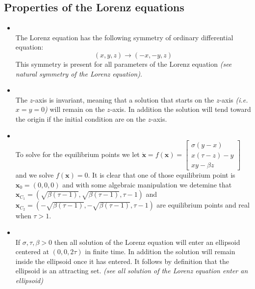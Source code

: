 \documentclass[12pt]{article}
\begin{document}
\subsection{Properties of the Lorenz equations}
\begin{itemize}
\item \textbf{}\\
The Lorenz equation has the following symmetry of ordinary differential equation:$$(x,y,z) \to (-x,-y,z)$$  This symmetry is present for all parameters of the Lorenz equation \textit{(see natural symmetry of the Lorenz equation)}.
\item \textbf{}\\
The $z$-axis is invariant, meaning that a solution that starts on the $z$-axis \textit{(i.e. $x=y=0$)} will remain on the $z$-axis.  In addition the solution will tend toward the origin if the initial condition are on the $z$-axis. 
\item \textbf{}\\
To solve for the equilibrium points we let 
$\dot{\textbf{x}} = f(\textbf{x}) = \begin{bmatrix}
\sigma(y-x) \\
x(\tau - z) -y \\
xy - \beta z
\end{bmatrix}$
and we solve $f(\textbf{x})=0$.  It is clear that one of those equilibrium point is $\mathbf{x}_0 = (0,0,0)$ and with some algebraic manipulation we detemine that $\mathbf{x}_{C_1} = (\sqrt{\beta(\tau-1)}, \sqrt{\beta(\tau-1)}, \tau-1)$ and $\mathbf{x}_{C_2} = (-\sqrt{\beta(\tau-1)}, -\sqrt{\beta(\tau-1)}, \tau-1)$ are equilibrium points and real when $\tau>1$.


\item \textbf{}\\
If $\sigma, \tau, \beta >0$ then all solution of the Lorenz equation will 
enter an ellipsoid centered at $(0,0,2\tau )$ in finite time.  In addition 
the solution will remain inside the ellipsoid once it has entered.  It follows 
by definition that the ellipsoid is an attracting set.
\textit{(see all solution of the Lorenz equation enter an ellipsoid)}

\end{itemize}
\end{document}
